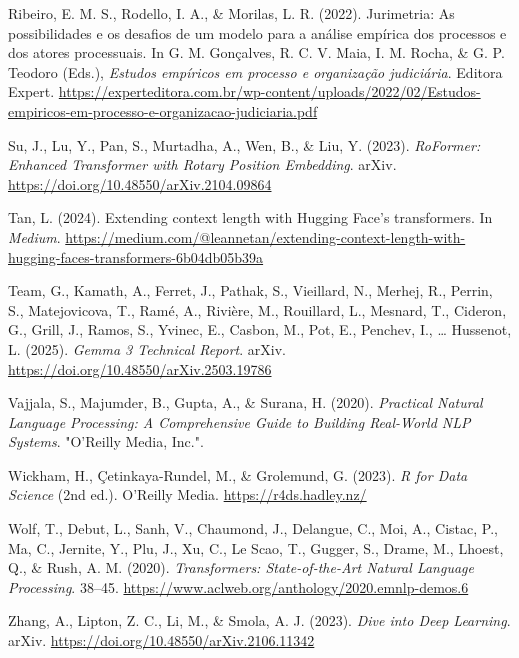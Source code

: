 \documentclass[
  12pt,
]{article}
\newlength{\cslhangindent}
\newenvironment{CSLReferences}[2] %
 {\begin{list}{}{%
  \setlength{\itemindent}{0pt}
  \setlength{\leftmargin}{0pt}
  \setlength{\parsep}{0pt}
  \ifodd #1
   \setlength{\leftmargin}{\cslhangindent}
   \setlength{\itemindent}{-1\cslhangindent}
  \fi
  \setlength{\itemsep}{#2\baselineskip}}}
 {\end{list}}
\begin{document}
\begin{CSLReferences}{1}{0}
Ribeiro, E. M. S., Rodello, I. A., \& Morilas, L. R. (2022). Jurimetria:
As possibilidades e os desafios de um modelo para a análise empírica dos
processos e dos atores processuais. In G. M. Gonçalves, R. C. V. Maia,
I. M. Rocha, \& G. P. Teodoro (Eds.), \emph{Estudos empíricos em
processo e organização judiciária}. Editora Expert.
\url{https://experteditora.com.br/wp-content/uploads/2022/02/Estudos-empiricos-em-processo-e-organizacao-judiciaria.pdf}

Su, J., Lu, Y., Pan, S., Murtadha, A., Wen, B., \& Liu, Y. (2023).
\emph{{RoFormer}: {Enhanced} {Transformer} with {Rotary} {Position}
{Embedding}}. arXiv. \url{https://doi.org/10.48550/arXiv.2104.09864}

Tan, L. (2024). Extending context length with {Hugging} {Face}'s
transformers. In \emph{Medium}.
\url{https://medium.com/@leannetan/extending-context-length-with-hugging-faces-transformers-6b04db05b39a}

Team, G., Kamath, A., Ferret, J., Pathak, S., Vieillard, N., Merhej, R.,
Perrin, S., Matejovicova, T., Ramé, A., Rivière, M., Rouillard, L.,
Mesnard, T., Cideron, G., Grill, J., Ramos, S., Yvinec, E., Casbon, M.,
Pot, E., Penchev, I., \ldots{} Hussenot, L. (2025). \emph{Gemma 3
{Technical} {Report}}. arXiv.
\url{https://doi.org/10.48550/arXiv.2503.19786}

Vajjala, S., Majumder, B., Gupta, A., \& Surana, H. (2020).
\emph{Practical {Natural} {Language} {Processing}: {A} {Comprehensive}
{Guide} to {Building} {Real}-{World} {NLP} {Systems}}. "O'Reilly Media,
Inc.".

Wickham, H., Çetinkaya-Rundel, M., \& Grolemund, G. (2023). \emph{R for
{Data} {Science}} (2nd ed.). O'Reilly Media.
\url{https://r4ds.hadley.nz/}

Wolf, T., Debut, L., Sanh, V., Chaumond, J., Delangue, C., Moi, A.,
Cistac, P., Ma, C., Jernite, Y., Plu, J., Xu, C., Le Scao, T., Gugger,
S., Drame, M., Lhoest, Q., \& Rush, A. M. (2020). \emph{Transformers:
{State}-of-the-{Art} {Natural} {Language} {Processing}}. 38--45.
\url{https://www.aclweb.org/anthology/2020.emnlp-demos.6}

Zhang, A., Lipton, Z. C., Li, M., \& Smola, A. J. (2023). \emph{Dive
into {Deep} {Learning}}. arXiv.
\url{https://doi.org/10.48550/arXiv.2106.11342}

\end{CSLReferences}
\end{document}
